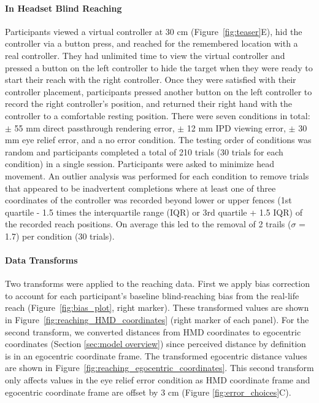 \paragraph{In Headset Blind Reaching} 
Participants viewed a virtual controller at 30 cm (Figure~\ref{fig:teaser}E), hid the controller via a button press, and reached for the remembered location with a real controller. They had unlimited time to view the virtual controller and pressed a button on the left controller to hide the target when they were ready to start their reach with the right controller. Once they were satisfied with their controller placement, participants pressed another button on the left controller to record the right controller's position, and returned their right hand with the controller to a comfortable resting position. There were seven conditions in total: $\pm$ 55 mm direct passthrough rendering error, $\pm$ 12 mm IPD viewing error, $\pm$ 30 mm eye relief error, and a no error condition. The testing order of conditions was random and participants completed a total of 210 trials (30 trials for each condition) in a single session. Participants were asked to minimize head movement. An outlier analysis was performed for each condition to remove trials that appeared to be inadvertent completions where at least one of three coordinates of the controller was recorded beyond lower or upper fences (1st quartile - 1.5 times the interquartile range (IQR) or 3rd quartile + 1.5 IQR) of the recorded reach positions. On average this led to the removal of 2 trails ($\sigma$ = 1.7) per condition (30 trials).


\paragraph{Data Transforms}
Two transforms were applied to the reaching data. First we apply bias correction to account for each participant's baseline blind-reaching bias from the real-life reach (Figure~\ref{fig:bias_plot}, right marker). These transformed values are shown in Figure~\ref{fig:reaching_HMD_coordinates} (right marker of each panel). For the second transform, we converted distances from HMD coordinates to egocentric coordinates (Section \ref{sec:model overview}) since perceived distance by definition is in an egocentric coordinate frame. The transformed egocentric distance values are shown in Figure~\ref{fig:reaching_egocentric_coordinates}. This second transform only affects values in the eye relief error condition as HMD coordinate frame and egocentric coordinate frame are offset by 3 cm (Figure \ref{fig:error_choices}C). 

